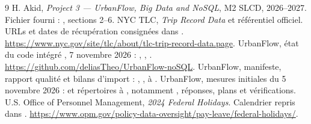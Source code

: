 \begin{thebibliography}{9}\small
{} H. Akid, \emph{Project 3 --- UrbanFlow, Big Data and NoSQL}, M2 SLCD, 2026--2027. Fichier fourni : , sections 2--6.
 NYC TLC, \emph{Trip Record Data} et référentiel officiel. URLs et dates de récupération consignées dans . \url{https://www.nyc.gov/site/tlc/about/tlc-trip-record-data.page}.
 UrbanFlow, état du code intégré , 7 novembre 2026 : , , . \url{https://github.com/deliasTheo/UrbanFlow-noSQL}.
 UrbanFlow, manifeste, rapport qualité et bilans d'import : , ,  à .
 UrbanFlow, mesures initiales du 5 novembre 2026 :  et répertoires  à , notamment , réponses, plans et vérifications.
 U.S. Office of Personnel Management, \emph{2024 Federal Holidays}. Calendrier repris dans . \url{https://www.opm.gov/policy-data-oversight/pay-leave/federal-holidays/}.
\end{thebibliography}

